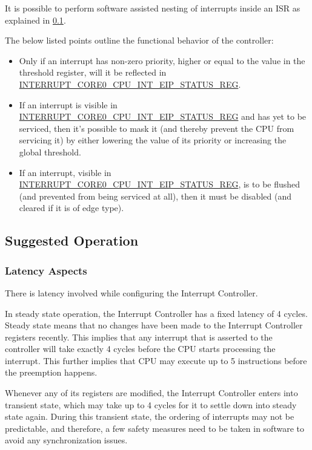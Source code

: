 \documentclass[main\_\_EN.tex]{subfiles}
\begin{document}
It is possible to perform software assisted nesting of interrupts inside an ISR as explained in \ref{sec:riscvcpu-int-suggest-op}.

The below listed points outline the functional behavior of the controller:

\begin{itemize}
    \item Only if an interrupt has non-zero priority, higher or equal to the value in the threshold register, will it be reflected in \hyperref[regdesc:INTERRUPTCORE0CPUINTEIPSTATUSREG]{INTERRUPT\_CORE0\_CPU\_INT\_EIP\_STATUS\_REG}.
    \item If an interrupt is visible in \hyperref[regdesc:INTERRUPTCORE0CPUINTEIPSTATUSREG]{INTERRUPT\_CORE0\_CPU\_INT\_EIP\_STATUS\_REG} and has yet to be serviced, then it's possible to mask it (and thereby prevent the CPU from servicing it) by either lowering the value of its priority or increasing the global threshold.
    \item If an interrupt, visible in \hyperref[regdesc:INTERRUPTCORE0CPUINTEIPSTATUSREG]{INTERRUPT\_CORE0\_CPU\_INT\_EIP\_STATUS\_REG}, is to be flushed (and prevented from being serviced at all), then it must be disabled (and cleared if it is of edge type).
\end{itemize}

\subsection{Suggested Operation}
\label{sec:riscvcpu-int-suggest-op}

\subsubsection{Latency Aspects}
\label{sec:riscvcpu-int-latency}

There is latency involved while configuring the Interrupt Controller.

In steady state operation, the Interrupt Controller has a fixed latency of 4 cycles. Steady state means that no changes have been made to the Interrupt Controller registers recently. This implies that any interrupt that is asserted to the controller will take exactly 4 cycles before the CPU starts processing the interrupt. This further implies that CPU may execute up to 5 instructions before the preemption happens.

Whenever any of its registers are modified, the Interrupt Controller enters into transient state, which may take up to 4 cycles for it to settle down into steady state again. During this transient state, the ordering of interrupts may not be predictable, and therefore, a few safety measures need to be taken in software to avoid any synchronization issues.
\end{document}
